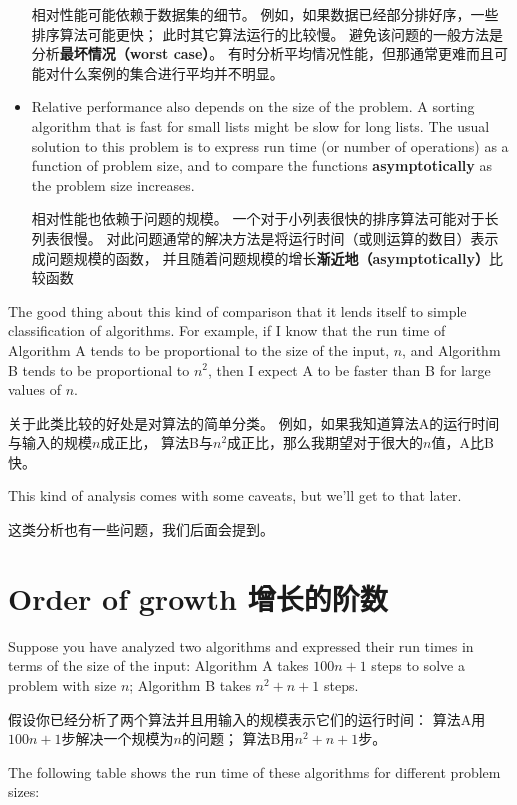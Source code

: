 \documentclass[10pt]{book}
\begin{document}
\begin{CJK}{UTF8}{gbsn}
\begin{itemize}
相对性能可能依赖于数据集的细节。
例如，如果数据已经部分排好序，一些排序算法可能更快；
此时其它算法运行的比较慢。
避免该问题的一般方法是分析{\bf 最坏情况（worst case）}。
有时分析平均情况性能，但那通常更难而且可能对什么案例的集合进行平均并不明显。

\item Relative performance also depends on the size of the
problem.  A sorting algorithm that is fast for small lists
might be slow for long lists.
The usual solution to this problem is to express run time
(or number of operations) as a function of problem size,
and to compare the functions {\bf asymptotically} as the problem
size increases.

相对性能也依赖于问题的规模。
一个对于小列表很快的排序算法可能对于长列表很慢。
对此问题通常的解决方法是将运行时间（或则运算的数目）表示成问题规模的函数，
并且随着问题规模的增长{\bf 渐近地（asymptotically）}比较函数

\end{itemize}

The good thing about this kind of comparison that it lends
itself to simple classification of algorithms.  For example,
if I know that the run time of Algorithm A tends to be
proportional to the size of the input, $n$, and Algorithm B
tends to be proportional to $n^2$, then I
expect A to be faster than B for large values of $n$.

关于此类比较的好处是对算法的简单分类。
例如，如果我知道算法A的运行时间与输入的规模$n$成正比，
算法B与$n^2$成正比，那么我期望对于很大的$n$值，A比B快。

This kind of analysis comes with some caveats, but we'll get
to that later.

这类分析也有一些问题，我们后面会提到。

\section{Order of growth 增长的阶数}

Suppose you have analyzed two algorithms and expressed
their run times in terms of the size of the input:
Algorithm A takes $100n+1$ steps to solve a problem with
size $n$; Algorithm B takes $n^2 + n + 1$ steps.

假设你已经分析了两个算法并且用输入的规模表示它们的运行时间：
算法A用$100n+1$步解决一个规模为$n$的问题；
算法B用$n^2 + n + 1$步。

The following table shows the run time of these algorithms
for different problem sizes:


\end{CJK}
\end{document}
